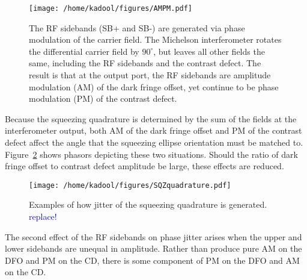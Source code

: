 \documentclass{ligodoc}
\begin{document}
\begin{figure}
\begin{centering}
\texttt{[image: /home/kadool/figures/AMPM.pdf]}
\caption{The RF sidebands (SB+ and SB-) are generated via phase
  modulation of the carrier field. The Michelson interferometer
  rotates the differential carrier field by $90^\circ$, but leaves all
  other fields the same, including the RF sidebands and the contrast
  defect. The result is that at the output port, the RF sidebands are
  amplitude modulation (AM) of the dark fringe offset, yet continue to
  be phase modulation (PM) of the contrast defect.}
\label{fig:AMPM}
\end{centering}
\end{figure}

Because the squeezing quadrature is determined by the sum of the
fields at the interferometer output, both AM of the dark fringe offset
and PM of the contrast defect affect the angle that the squeezing
ellipse orientation must be matched to. Figure~\ref{fig:sqzquad} shows
phasors depicting these two situations. Should the ratio of dark
fringe offset to contrast defect amplitude be large, these effects are
reduced.

\begin{figure}
\begin{centering}
\texttt{[image: /home/kadool/figures/SQZquadrature.pdf]}
\caption{Examples of how jitter of the squeezing quadrature is
  generated. \textcolor{blue}{replace!}}
\label{fig:sqzquad}
\end{centering}
\end{figure}

The second effect of the RF sidebands on phase jitter arises when the
upper and lower sidebands are unequal in amplitude. Rather than
produce pure AM on the DFO and PM on the CD, there is some component
of PM on the DFO and AM on the CD.
\end{document}
